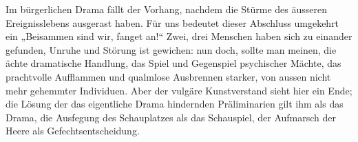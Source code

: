 Im bürgerlichen Drama fällt der Vorhang, nachdem die Stürme des äusseren Ereignisslebens ausgerast haben. Für uns bedeutet dieser Abschluss umgekehrt ein „Beisammen sind wir, fanget an!“ Zwei, drei Menschen haben sich zu einander gefunden, Unruhe und Störung ist gewichen: nun  doch, sollte man meinen, die ächte dramatische Handlung, das Spiel und Gegenspiel psychischer Mächte, das prachtvolle Aufflammen und qualmlose Ausbrennen starker, von aussen nicht mehr gehemmter Individuen. Aber der vulgäre Kunstverstand sieht hier ein Ende; die Lösung der das eigentliche Drama hindernden Präliminarien gilt ihm als das Drama, die Ausfegung des Schauplatzes als das Schauspiel, der Aufmarsch der Heere als Gefechtsentscheidung.
\par

